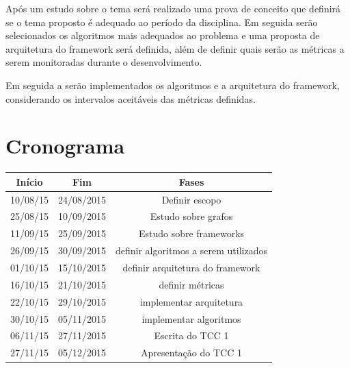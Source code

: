 Após um estudo sobre o tema será realizado uma prova de conceito que definirá se o tema proposto é adequado ao período da disciplina. Em seguida serão selecionados os algoritmos mais adequados ao problema e uma proposta de arquitetura do framework será definida, além de definir quais serão as métricas a serem monitoradas durante o desenvolvimento.

Em seguida a serão implementados os algoritmos e a arquitetura do framework, considerando os intervalos aceitáveis das métricas definidas.

\section*{Cronograma}

\begin{tabular}{SSS} \toprule
    {Início} & {Fim} & {Fases} \\ \toprule
    {10/08/15} & {24/08/2015} & {Definir escopo} \\
    {25/08/15} & {10/09/2015} & {Estudo sobre grafos} \\
    {11/09/15} & {25/09/2015} & {Estudo sobre frameworks} \\ \midrule
    {26/09/15} & {30/09/2015} & {definir algoritmos a serem utilizados} \\
    {01/10/15} & {15/10/2015} & {definir arquitetura do framework} \\
    {16/10/15} & {21/10/2015} & {definir métricas} \\ \midrule
    {22/10/15} & {29/10/2015} & {implementar arquitetura} \\
    {30/10/15} & {05/11/2015} & {implementar algoritmos} \\ \midrule
    {06/11/15} & {27/11/2015} & {Escrita do TCC 1} \\
    {27/11/15} & {05/12/2015} & {Apresentação do TCC 1} \\ \bottomrule
\end{tabular}

\postextual

 


